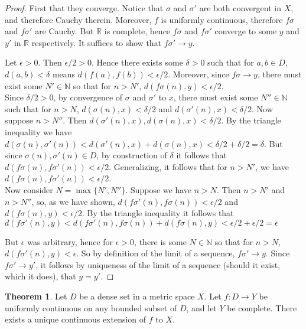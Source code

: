 \documentclass[11pt]{article}
\newcommand{\R}{\mathbb{R}}
\newcommand{\N}{\mathbb{N}}
\theoremstyle{definition}
\newtheorem{theorem}{Theorem}
\begin{document}
\begin{proof}
First that they converge. Notice that $\sigma$ and $\sigma'$ are both convergent in $X$, and therefore Cauchy therein. Moreover, $f$ is uniformly continuous, therefore $f\sigma$ and $f\sigma'$ are Cauchy. But $\R$ is complete, hence $f\sigma$ and $f\sigma'$ converge to some $y $ and $y'$ in $\R$ respectively. It suffices to show that $f\sigma'\to y$.

Let $\epsilon> 0$. Then $\epsilon/2 > 0$. Hence there exists some $\delta > 0$ such that for $a,b\in D$, $d(a,b)< \delta $ means $d(f(a), f(b) ) < \epsilon /2$. Moreover, since $f\sigma\to y$, there must exist some $N' \in \N$ so that for $n >N'$, $d(f\sigma(n) , y) < \epsilon/2$.\\

 Since $\delta/2 > 0$, by convergence of $\sigma$ and $\sigma'$ to $x$, there must exist some $N''\in \N$ such that for $n>N$, $d(\sigma(n), x) < \delta/2$ and $d(\sigma'(n) , x) < \delta/2$. Now suppose $n> N''$. Then $d(\sigma'(n), x),d(\sigma(n), x) < \delta/2$.  By the triangle inequality we have $d(\sigma(n), \sigma'(n) ) < d(\sigma'(n), x) + d(\sigma(n), x) < \delta/2 + \delta/2 = \delta$. But since $\sigma(n),\sigma'(n) \in D$, by construction of $\delta$ it follows that $ d(f\sigma(n), f\sigma'(n) ) < \epsilon /2. $ Generalizing, it follows that for $n> N'$, we have $d(f\sigma(n) , f\sigma'(n) ) < \epsilon/2$.\\
 
 
Now consider $N = \max\{N', N''\}$. Suppose we have $n> N$. Then $n> N'$ and $n> N''$, so, as we have shown, $d(f\sigma'(n) , f\sigma(n) ) < \epsilon /2$ and $ d(f\sigma(n), y) < \epsilon /2$. By the triangle inequality it follows that $ d(f\sigma'(n) , y ) <  d(f\sigma'(n) , f\sigma(n) ) + d(f\sigma(n), y) < \epsilon /2 + \epsilon /2 = \epsilon$

But $\epsilon$ was arbitrary, hence for $\epsilon > 0$, there is some $N\in \N$ so that for $n > N$, $d(f\sigma'(n) , y) < \epsilon$. So by definition of the limit of a sequence, $f\sigma' \to y$. Since $f\sigma' \to y'$, it follows by uniqueness of the limit of a sequence (should it exist, which it does), that $y = y'$. 
\end{proof}

\begin{theorem}
Let $D$ be a dense set in a metric space $X$. Let $f: D\to Y$ be uniformly continuous on any bounded subset of $D$, and let $Y$ be complete. There exists a unique continuous extension of $f$ to $X$. 
\end{theorem}
\end{document}
